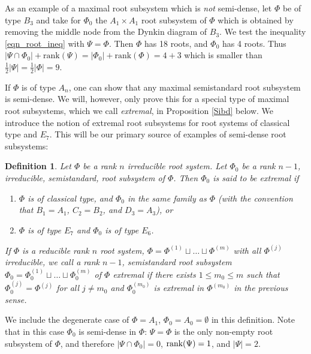 \documentclass[12pt]{amsart}
\newtheorem{definition}[theorem]{Definition}
\theoremstyle{remark}
\begin{document}
As an example of a maximal root subsystem which is \textit{not} semi-dense, let $\Phi$ be of type $B_3$ and take for $\Phi_0$ the $A_1 \times A_1$ root subsystem of $\Phi$ which is obtained by removing the middle node from the Dynkin diagram of $B_3$. We test the inequality \eqref{eqn_root_ineq} with $\Psi=\Phi$. Then $\Phi$ has 18 roots, and $\Phi_0$ has 4 roots. Thus $|\Psi \cap \Phi_0| + \text{rank}(\Psi)=|\Phi_0| + \text{rank}(\Phi)= 4 + 3$ which is smaller than $\frac{1}{2}|\Psi|=\frac{1}{2}|\Phi| = 9$.

If $\Phi$ is of type $A_n$, one can show that any maximal semistandard root subsystem is semi-dense. We will, however, only prove this for a special type of maximal root subsystems, which we call \textit{extremal}, in Proposition \ref{Sibd} below. We introduce the notion of extremal root subsystems for root systems of classical type and $E_7$. This will be our primary source of examples of semi-dense root subsystems:


\begin{definition}\label{def:extremal} 
Let $\Phi$ be a rank $n$ irreducible root system. Let $\Phi_0$ be a rank $n-1$, irreducible, semistandard,  root subsystem of $\Phi$. Then $\Phi_0$ is said to be {\rm extremal} if 
\begin{enumerate}
\item $\Phi$ is of classical type, and $\Phi_0$ in the same family as $\Phi$ (with the convention that $B_1= A_1$, $C_2= B_2$, and $D_3= A_3$), or
\item $\Phi$ is of type $E_7$ and $\Phi_0$ is of type $E_6$.
\end{enumerate}
If $\Phi$ is a reducible rank $n$ root system, $\Phi=\Phi^{(1)}\sqcup\dots\sqcup \Phi^{(m)}$ with all $\Phi^{(j)}$ irreducible, we call a rank $n-1$, semistandard root subsystem $\Phi_0= \Phi_0^{(1)}\sqcup\dots\sqcup \Phi_0^{(m)}$ of $\Phi$ extremal if there exists $1\le m_0\le m$ such that $\Phi_0^{(j)}=\Phi^{(j)}$ for all $j\neq m_0$ and $\Phi_0^{(m_0)}$ is extremal in $\Phi^{(m_0)}$ in the previous sense. 
\end{definition}
We include the degenerate case of $\Phi=A_1$, $\Phi_0=A_0=\emptyset$ in this definition. Note that in this case $\Phi_0$ is semi-dense in $\Phi$: $\Psi=\Phi$ is the only non-empty root subsystem of $\Phi$, and therefore $|\Psi\cap\Phi_0|=0$, $\textnormal{rank}(\Psi)=1$, and $|\Psi|=2$.
\end{document}
